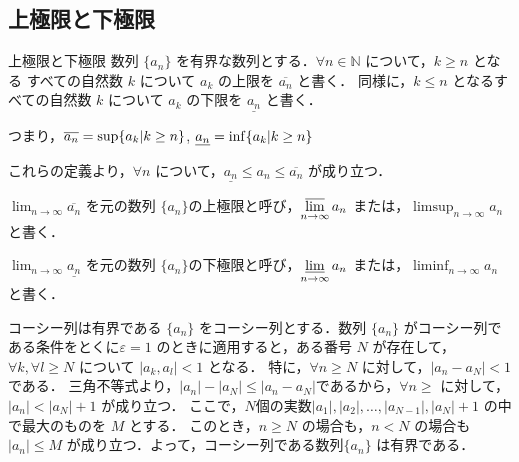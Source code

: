 \documentclass[a4paper]{ltjsarticle}
\begin{document}
  \subsection{上極限と下極限}

  \begin{tcb}{上極限と下極限}{}
   数列 $\{a_n\}$ を有界な数列とする．$\forall n \in \mathbb{N}$ について，$k \geq n$ となる すべての自然数 $k$ について $a_k$ の上限を $\overline{a_n}$ と書く． 
   同様に，$k \leq n$ となるすべての自然数 $k$ について $a_k$ の下限を $\underline{a_n}$ と書く．

   つまり，$\overline{a_n} = {\sup\{a_k | k \geq n\}}$, $\underline{a_n} ={\inf\{a_k | k \geq n\}}$ 

   これらの定義より，$\forall n$ について，$\underline{a_n} \leq a_n \leq \overline{a_n}$ が成り立つ．

   $\displaystyle \lim_{n \to \infty} \overline{a_n}$ を元の数列 $\{a_n\} $の上極限と呼び，$\displaystyle \varlimsup_{n \to \infty} a_n$ または，$\displaystyle \limsup_{n \to \infty} a_n$ と書く．

   $\displaystyle \lim_{n \to \infty} \underline{a_n}$ を元の数列 $\{a_n\} $の下極限と呼び，$\displaystyle \varliminf_{n \to \infty} a_n$ または，$\displaystyle \liminf_{n \to \infty} a_n$ と書く．

  \end{tcb}

  \begin{lemma}{コーシー列は有界である}{}
   $\{a_n\}$ をコーシー列とする．数列 $\{a_n\}$ がコーシー列である条件をとくに$\varepsilon = 1$ のときに適用すると，ある番号 $N$ が存在して，$\forall k, \forall l \geq N$ について $|a_k, a_l| < 1$ となる．
   特に，$\forall n \geq N$ に対して，$|a_n - a_N| < 1$ である．
   三角不等式より，$|a_n| - |a_N| \leq |a_n - a_N|$であるから，$\forall n \geq$ に対して，$|a_n| < |a_N| + 1$ が成り立つ．
   ここで，$N 個の実数 |a_1|, |a_2|, \ldots, |a_{N-1}|, |a_N| + 1$ の中で最大のものを $M$ とする．
   このとき，$n \geq N$ の場合も，$n < N$ の場合も $|a_n| \leq M$ が成り立つ．よって，コーシー列である数列$\{a_n\}$ は有界である．
  \end{lemma}
\end{document}
